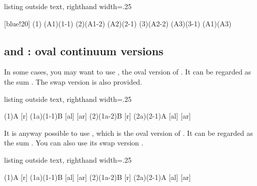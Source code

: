 \begin{tcblisting}{listing outside text, righthand width=.25\linewidth}
\begin{istgame}
\cntmdistance*{10mm}{20mm}
[blue!20]
\istrootcntmA(1)          \istbA \endist
\istroot(A1)(1-1)   \istb \istb  \endist
\istrootcntmA(2)(A1-2)    \istbA \endist
\istroot(A2)(2-1)   \istb \istb  \endist
{}
\cntmAlayerpreset %
\istrootcntmA(3)(A2-2)    \istbA \endist
\istroot(A3)(3-1)   \istb \istb  \endist
\xtInfosetO[fill=green](A1)(A3)
\end{istgame}
\end{tcblisting}


\subsection{\protect\cmd{\istrootocntm} and \protect\cmd{\istrootocntmA}: oval continuum versions}

In some cases, you may want to use \icmd{\istrootocntmA}, the oval version of \cmd{\istrootcntmA}.
It can be regarded as the sum \cmd{\istrooto} \xw{+} . The swap version  is also provided.

\begin{tcblisting}{listing outside text, righthand width=.25\linewidth}
\begin{istgame}
\setistEllipseNodeStyle[white]
\cntmdistance*{10mm}{20mm}
\cntmApreset[dashed]
\istrootocntmA(1){A}  [r]        \istbm  \endist
\istrooto(1a)(1-1){B}
                      [al]  [ar]  \endist
\istrootocntmA(2)(1a-2){B}  [r]  \istbm  \endist
\istrooto(2a)(2-1){A}
                      [al]  [ar]  \endist
\end{istgame}
\end{tcblisting}

It is anyway possible to use \icmd{\istrootocntm}, which is the oval version of \cmd{\istrootcntm}. 
It can be regarded as the sum \cmd{\istrooto} \xw{+} . 
You can also use its swap version .

\begin{tcblisting}{listing outside text, righthand width=.25\linewidth}
\begin{istgame}
\cntmdistance*{10mm}{20mm}
\cntmApreset[dashed]
\istrootocntm(1){A}  [r]        \istbm  \endist
\istrooto(1a)(1-1){B}
                     [al]  [ar]  \endist
\istrootocntm(2)(1a-2){B}  [r]  \istbm  \endist
\istrooto(2a)(2-1){A}
                     [al]  [ar]  \endist
\end{istgame}
\end{tcblisting}


